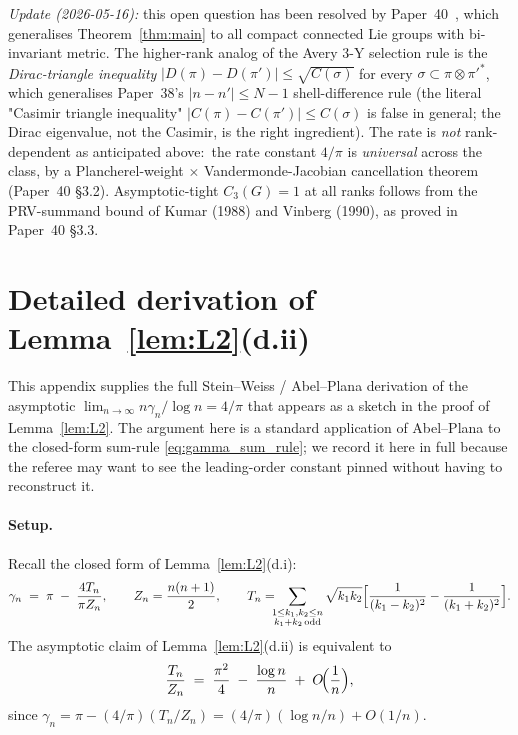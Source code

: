 \documentclass[11pt,a4paper]{article}
\theoremstyle{plain}
\theoremstyle{definition}
\begin{document}
\emph{Update (2026-05-16):} this open question has been resolved by
Paper~40~\cite{paper40_unified}, which generalises
Theorem~\ref{thm:main} to all compact connected Lie groups with
bi-invariant metric. The higher-rank analog of the Avery 3-Y selection
rule is the \emph{Dirac-triangle inequality}
$|D(\pi) - D(\pi')| \le \sqrt{C(\sigma)}$ for every
$\sigma \subset \pi \otimes \pi'^*$, which generalises Paper~38's
$|n - n'| \le N - 1$ shell-difference rule (the literal "Casimir
triangle inequality" $|C(\pi) - C(\pi')| \le C(\sigma)$ is false in
general; the Dirac eigenvalue, not the Casimir, is the right
ingredient). The rate is \emph{not} rank-dependent as anticipated
above:\ the rate constant $4/\pi$ is \emph{universal} across the
class, by a Plancherel-weight $\times$ Vandermonde-Jacobian
cancellation theorem (Paper~40 \S 3.2). Asymptotic-tight
$C_3(G) = 1$ at all ranks follows from the PRV-summand bound of
Kumar (1988) and Vinberg (1990), as proved in Paper~40 \S 3.3.

\appendix
\section{Detailed derivation of Lemma~\ref{lem:L2}(d.ii)}
\label{app:stein_weiss}

This appendix supplies the full Stein--Weiss / Abel--Plana derivation
of the asymptotic
$\lim_{n\to\infty} n\gamma_n / \log n = 4/\pi$ that appears as a
sketch in the proof of Lemma~\ref{lem:L2}. The argument here is a
standard application of Abel--Plana to the closed-form sum-rule
\eqref{eq:gamma_sum_rule}; we record it here in full because the
referee may want to see the leading-order constant pinned without
having to reconstruct it.

\paragraph{Setup.}
Recall the closed form of Lemma~\ref{lem:L2}(d.i):
\begin{equation}\label{eq:gamma_closed_form_repeat}
   \gamma_n \;=\; \pi \;-\; \frac{4 T_n}{\pi Z_n}, \qquad
   Z_n = \frac{n(n+1)}{2}, \qquad
   T_n = \!\!\!\sum_{\substack{1\le k_1, k_2 \le n \\ k_1 + k_2\,\mathrm{odd}}}
                \sqrt{k_1 k_2}\Bigl[\frac{1}{(k_1-k_2)^2} - \frac{1}{(k_1+k_2)^2}\Bigr].
\end{equation}
The asymptotic claim of Lemma~\ref{lem:L2}(d.ii) is equivalent to
\begin{equation}\label{eq:Tn_asymptotic}
   \frac{T_n}{Z_n} \;=\; \frac{\pi^2}{4} \;-\; \frac{\log n}{n}
   \;+\; O\!\Bigl(\frac{1}{n}\Bigr),
\end{equation}
since $\gamma_n = \pi - (4/\pi)(T_n/Z_n) =
(4/\pi)(\log n / n) + O(1/n)$.
\end{document}
